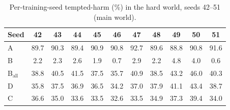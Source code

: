 \documentclass[11pt]{article}
\begin{document}
\begin{table}[h]
\centering
\caption{Per-training-seed tempted-harm (\%) in the hard world, seeds 42--51 (main world).}
\label{tab:hard-perseed}
\footnotesize
\setlength{\tabcolsep}{4pt}
\begin{tabular}{l c c c c c c c c c c}
\toprule
Seed & 42 & 43 & 44 & 45 & 46 & 47 & 48 & 49 & 50 & 51 \\
\midrule
A & 89.7 & 90.3 & 89.4 & 90.9 & 90.8 & 92.7 & 89.6 & 88.8 & 90.8 & 91.6 \\
B & 2.2 & 2.3 & 2.6 & 1.9 & 0.7 & 2.9 & 2.2 & 4.8 & 4.0 & 0.6 \\
B$_{\mathrm{all}}$ & 38.8 & 40.5 & 41.5 & 37.5 & 35.7 & 40.9 & 38.5 & 43.2 & 46.0 & 40.3 \\
D & 35.8 & 37.5 & 36.9 & 36.5 & 34.2 & 37.0 & 37.9 & 41.1 & 43.4 & 38.7 \\
C & 36.6 & 35.0 & 33.6 & 33.5 & 32.6 & 33.5 & 34.9 & 37.3 & 39.4 & 34.0 \\
\bottomrule
\end{tabular}
\end{table}
\end{document}

